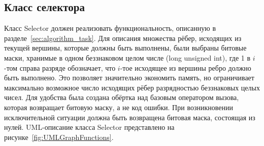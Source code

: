 \subsection{Класс селектора}
Класс \textsf{Selector} должен реализовать функциональность, описанную в разделе~\ref{sec:algorithm_task}. Для описания множества рёбер, исходящих из текущей вершины, которые должны быть выполнены, были выбраны битовые маски, хранимые в одном беззнаковом целом числе (\textsf{long unsigned int}), где 1 в $i$-том справа разряде обозначает, что $i$-тое исходящее из вершины ребро должно быть выполнено. Это позволяет значительно экономить память, но ограничивает максимально возможное число исходящих рёбер разрядностью беззнаковых целых чисел. Для удобства была создана обёртка над базовым оператором вызова, которая возвращает битовую маску, а не код ошибки. При возникновении исключительной ситуации должна быть возвращена битовая маска, состоящая из нулей. UML-описание класса \textsf{Selector} представлено на рисунке~\ref{fig:UMLGraphFunctions}.

